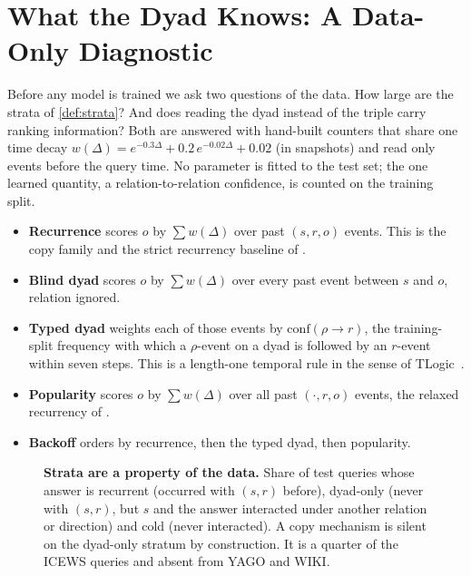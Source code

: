 \section{What the Dyad Knows: A Data-Only Diagnostic}
\label{sec:diag}

Before any model is trained we ask two questions of the data. How large are the strata of \cref{def:strata}? And does reading the dyad instead of the triple carry ranking information? Both are answered with hand-built counters that share one time decay $w(\Delta) = e^{-0.3\Delta} + 0.2\,e^{-0.02\Delta} + 0.02$ (in snapshots) and read only events before the query time. No parameter is fitted to the test set; the one learned quantity, a relation-to-relation confidence, is counted on the training split.

\begin{itemize}\setlength\itemsep{1pt}
  \item \textbf{Recurrence} scores $o$ by $\sum w(\Delta)$ over past $(s, r, o)$ events. This is the copy family and the strict recurrency baseline of \cite{gastinger2024history}.
  \item \textbf{Blind dyad} scores $o$ by $\sum w(\Delta)$ over every past event between $s$ and $o$, relation ignored.
  \item \textbf{Typed dyad} weights each of those events by $\mathrm{conf}(\rho \to r)$, the training-split frequency with which a $\rho$-event on a dyad is followed by an $r$-event within seven steps. This is a length-one temporal rule in the sense of TLogic~\cite{liu2022tlogic}.
  \item \textbf{Popularity} scores $o$ by $\sum w(\Delta)$ over all past $(\cdot, r, o)$ events, the relaxed recurrency of \cite{gastinger2024history}.
  \item \textbf{Backoff} orders by recurrence, then the typed dyad, then popularity.
\end{itemize}

\begin{figure}[t]
  \centering
  \caption{\textbf{Strata are a property of the data.} Share of test queries whose answer is recurrent (occurred with $(s, r)$ before), dyad-only (never with $(s, r)$, but $s$ and the answer interacted under another relation or direction) and cold (never interacted). A copy mechanism is silent on the dyad-only stratum by construction. It is a quarter of the ICEWS queries and absent from YAGO and WIKI.}
  \label{fig:strata}
\end{figure}

